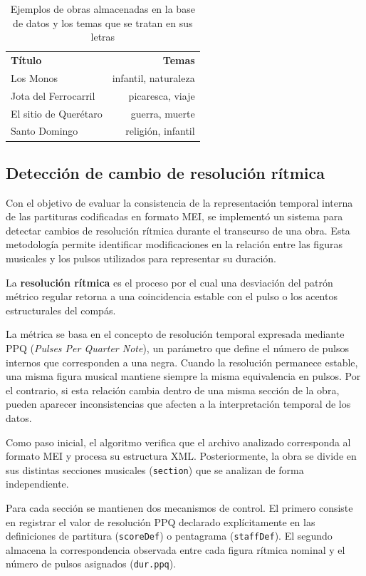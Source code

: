 \begin{table}[H]
\centering
\begin{tabular}{lr}
\textbf{Título} & \textbf{Temas} \\
Los Monos & infantil, naturaleza \\
Jota del Ferrocarril & picaresca, viaje \\
El sitio de Querétaro & guerra, muerte \\
Santo Domingo & religión, infantil \\
\end{tabular}
\caption{Ejemplos de obras almacenadas en la base de datos y los temas que se tratan en sus letras}
\end{table}

\subsection{Detección de cambio de resolución rítmica}
Con el objetivo de evaluar la consistencia de la representación temporal interna de las partituras codificadas en formato MEI, se implementó un sistema para detectar cambios de resolución rítmica durante el transcurso de una obra. Esta metodología permite identificar modificaciones en la relación entre las figuras musicales y los pulsos utilizados para representar su duración.

La \textbf{resolución rítmica} es el proceso por el cual una desviación del patrón métrico regular retorna a una coincidencia estable con el pulso o los acentos estructurales del compás.

La métrica se basa en el concepto de resolución temporal expresada mediante PPQ (\textit{Pulses Per Quarter Note}), un parámetro que define el número de pulsos internos que corresponden a una negra. Cuando la resolución permanece estable, una misma figura musical mantiene siempre la misma equivalencia en pulsos. Por el contrario, si esta relación cambia dentro de una misma sección de la obra, pueden aparecer inconsistencias que afecten a la interpretación temporal de los datos.

Como paso inicial, el algoritmo verifica que el archivo analizado corresponda al formato MEI y procesa su estructura XML. Posteriormente, la obra se divide en sus distintas secciones musicales (\verb|section|) que se analizan de forma independiente.

Para cada sección se mantienen dos mecanismos de control. El primero consiste en registrar el valor de resolución PPQ declarado explícitamente en las definiciones de partitura (\verb|scoreDef|) o pentagrama (\verb|staffDef|). El segundo almacena la correspondencia observada entre cada figura rítmica nominal y el número de pulsos asignados (\verb|dur.ppq|).

